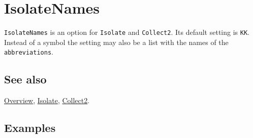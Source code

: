 \documentclass[../FeynCalcManual.tex]{subfiles}
\begin{document}
\hypertarget{isolatenames}{%
\section{IsolateNames}\label{isolatenames}}

\texttt{IsolateNames} is an option for \texttt{Isolate} and
\texttt{Collect2}. Its default setting is \texttt{KK}. Instead of a
symbol the setting may also be a list with the names of the
\texttt{abbreviations}.

\subsection{See also}

\hyperlink{toc}{Overview}, \hyperlink{isolate}{Isolate},
\hyperlink{collect2}{Collect2}.

\subsection{Examples}
\end{document}
